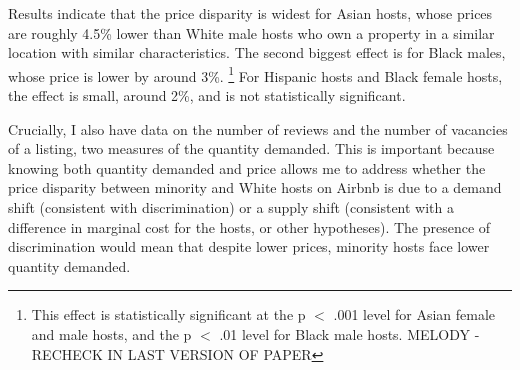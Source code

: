 
Results indicate that the price disparity is widest for Asian hosts, whose prices are roughly 4.5\% lower than White male hosts who own a property in a similar location with similar characteristics. The second biggest effect is for Black males, whose price is lower by around 3\%.%
	\footnote{This effect is statistically significant at the p $<$ .001 level for Asian female and male hosts, and the p $<$ .01 level for Black male hosts. MELODY - RECHECK IN LAST VERSION OF PAPER} 
For Hispanic hosts and Black female hosts, the effect is small, around 2\%, and is not statistically significant. 


Crucially, I also have data on the number of reviews and the number of vacancies of a listing, two measures of the quantity demanded. This is important because knowing both quantity demanded and price allows me to address whether the price disparity between minority and White hosts on Airbnb is due to a demand shift (consistent with discrimination) or a supply shift (consistent with a difference in marginal cost for the hosts, or other hypotheses). The presence of discrimination would mean that despite lower prices, minority hosts face lower quantity demanded. 

